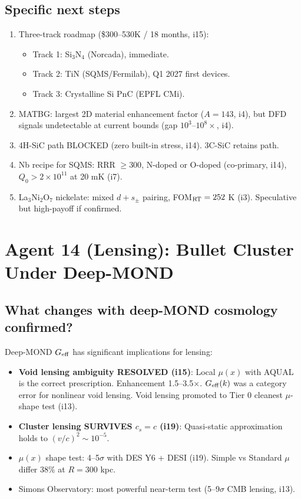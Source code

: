 \documentclass[11pt]{article}
\begin{document}
\subsection{Specific next steps}
\begin{enumerate}
\item Three-track roadmap (\$300--530K / 18 months, i15):
  \begin{itemize}
  \item Track 1: Si$_3$N$_4$ (Norcada), immediate.
  \item Track 2: TiN (SQMS/Fermilab), Q1 2027 first devices.
  \item Track 3: Crystalline Si PnC (EPFL CMi).
  \end{itemize}
\item MATBG: largest 2D material enhancement factor ($A = 143$, i4), but DFD signals
undetectable at current bounds (gap $10^3$--$10^8\times$, i4).
\item 4H-SiC path BLOCKED (zero built-in stress, i14). 3C-SiC retains path.
\item Nb recipe for SQMS: RRR $\geq 300$, N-doped or O-doped (co-primary, i14),
$Q_0 > 2 \times 10^{11}$ at 20 mK (i7).
\item La$_3$Ni$_2$O$_7$ nickelate: mixed $d + s_\pm$ pairing, FOM$_{\rm RT} = 252$ K (i3).
Speculative but high-payoff if confirmed.
\end{enumerate}

\newpage
\section{Agent 14 (Lensing): Bullet Cluster Under Deep-MOND}
\label{sec:agent14}

\subsection{What changes with deep-MOND cosmology confirmed?}

Deep-MOND $G_{\rm eff}$ has significant implications for lensing:
\begin{itemize}
\item \textbf{Void lensing ambiguity RESOLVED (i15)}: Local $\mu(x)$ with AQUAL is
the correct prescription. Enhancement 1.5--3.5$\times$. $G_{\rm eff}(k)$ was a
category error for nonlinear void lensing. Void lensing promoted to Tier 0
cleanest $\mu$-shape test (i13).
\item \textbf{Cluster lensing SURVIVES $c_s = c$ (i19)}: Quasi-static approximation
holds to $(v/c)^2 \sim 10^{-5}$.
\item $\mu(x)$ shape test: 4--5$\sigma$ with DES Y6 + DESI (i19). Simple vs Standard
$\mu$ differ 38\% at $R = 300$ kpc.
\item Simons Observatory: most powerful near-term test (5--9$\sigma$ CMB lensing, i13).
\end{itemize}
\end{document}
